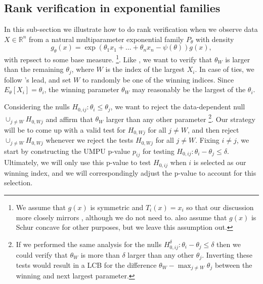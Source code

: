 \documentclass{article}
\newcommand{\R}{\mathbb{R}}
\begin{document}
\subsection{Rank verification in exponential families}

In this sub-section we illustrate how to do rank verification when we observe data $X \in \R^n$ from a natural multiparameter exponential family $P_{\theta}$ with density
\begin{equation}
    \label{eq:exp_fam}
    g_{\theta}(x) = \exp(\theta_1 x_1 + \dots + \theta_n x_n - \psi(\theta))g(x),
\end{equation}
with repsect to some base measure. \footnote{We assume that $g(x)$ is symmetric and $T_i(x) = x_i$ so that our discussion more closely mirrors \cite{Hung2019}, although we do not need to. \cite{Hung2019} also assume that $g(x)$ is Schur concave for other purposes, but we leave this assumption out.}. Like \cite{Hung2019}, we want to verify that $\theta_W$ is larger than the remaining $\theta_j$, where $W$ is the index of the largest $X_i$. In case of ties, we follow \cite{Hung2019}'s lead, and set $W$ to randomly be one of the winning indices. Since $E_{\theta}[X_i] = \theta_i$, the winning parameter $\theta_W$ may reasonably be the largest of the $\theta_i$. 

Considering the nulls $H_{0, ij} : \theta_i \leq \theta_j$, we want to reject the data-dependent null $\cup_{j \neq W} H_{0, Wj} $ and affirm that $\theta_W$ larger than any other parameter \footnote{If we performed the same analysis for the nulls $H^{\delta}_{0, ij} : \theta_i  - \theta_j \leq \delta$ then we could verify that $\theta_W$ is more than $\delta$ larger than any other $\theta_j$. Inverting these tests would result in a LCB for the difference $\theta_W - \max_{j \neq W } \theta_j$ between the winning and next largest parameter.}. Our strategy will be to come up with a valid test for $H_{0, Wj}$ for all $j \neq W$, and then reject $\cup_{j \neq W} H_{0, Wj}$ whenever we reject the tests $H_{0, Wj}$ for all $j \neq W$. Fixing $i \neq j$, we start by constructing the UMPU p-value $p_{ij}$ for testing $H_{0, ij}: \theta_i - \theta_j \leq \delta$. Ultimately, we will only use this p-value to test $H_{0, ij}$ when $i$ is selected as our winning index, and we will correspondingly adjust the p-value to account for this selection. 
\end{document}
